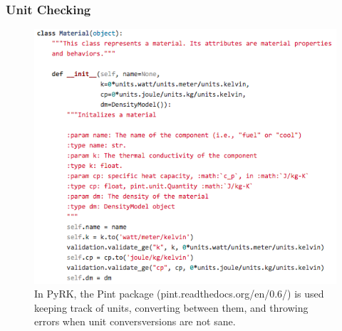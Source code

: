 \begin{frame}[fragile]
  \frametitle{Unit Checking}
  \begin{figure}[htbp!]
    \begin{center}
      \includegraphics[height=0.7\textheight]{./progress/pint_pyrk.png}
    \end{center}
    \caption{In PyRK, the Pint package (pint.readthedocs.org/en/0.6/) is used
    keeping track of units, converting between them, and throwing errors when
    unit conversversions are not sane.}
    \label{fig:doc_pyrk}
  \end{figure}
\end{frame}
